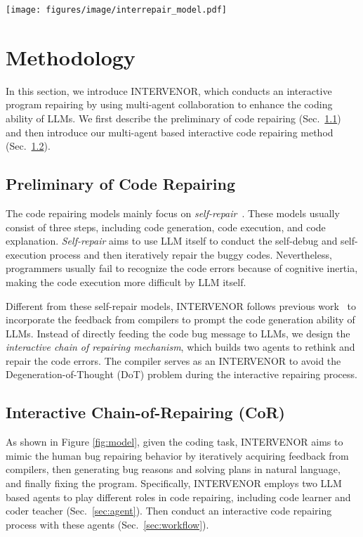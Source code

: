 \documentclass[11pt]{article}
\begin{document}
 


\begin{figure*}[t] \centering
    \texttt{[image: figures/image/interrepair\_model.pdf]}
    \caption{Illustration of Our  Interactive Chain of Repairing Model (INTERVENOR {\includegraphics[width=1.2em] {figures/image/title.jpg}}).} \label{fig:model}
\end{figure*} \section{Methodology}

In this section, we introduce INTERVENOR, which conducts an interactive program repairing by using multi-agent collaboration to enhance the coding ability of LLMs. We first describe the preliminary of code repairing (Sec.~\ref{model:pre}) and then introduce our multi-agent based interactive code repairing method (Sec.~\ref{model:codeagent}).

\subsection{Preliminary of Code Repairing}\label{model:pre}
The code repairing models mainly focus on \textit{self-repair}~\cite{Olausson2023IsSA,chen2023teaching}. These models usually consist of three steps, including code generation, code execution, and code explanation. \textit{Self-repair} aims to use LLM itself to conduct the self-debug and self-execution process and then iteratively repair the buggy codes. Nevertheless, programmers usually fail to recognize the code errors because of cognitive inertia, making the code execution more difficult by LLM itself.

Different from these self-repair models, INTERVENOR follows previous work~\cite{zhang2023selfedit,wang2022compilable} to incorporate the feedback from compilers to prompt the code generation ability of LLMs. Instead of directly feeding the code bug message to LLMs, we design the \textit{interactive chain of repairing mechanism}, which builds two agents to rethink and repair the code errors. The compiler serves as an INTERVENOR to avoid the Degeneration-of-Thought (DoT) problem during the interactive repairing process.

\subsection{Interactive Chain-of-Repairing (CoR)} \label{model:codeagent}
As shown in Figure \ref{fig:model}, given the coding task, INTERVENOR aims to mimic the human bug repairing behavior by iteratively acquiring feedback from compilers, then generating bug reasons and solving plans in natural language, and finally fixing the program. Specifically, INTERVENOR employs two LLM based agents to play different roles in code repairing, including code learner and coder teacher (Sec.~\ref{sec:agent}). Then conduct an interactive code repairing process with these agents (Sec.~\ref{sec:workflow}). 
\end{document}
